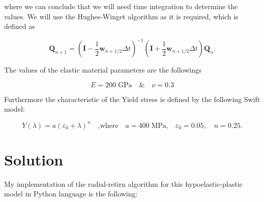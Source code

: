 \documentclass[12pt,a4paper]{article}
\begin{document}
where we can conclude that we will need time integration to determine the values. We will use the Hughes-Winget algorithm as it is required, which is defined as 

\begin{equation}
    \boldsymbol{Q}_{n+1} = \left(\boldsymbol{I} - \frac{1}{2} \boldsymbol{w}_{n+1/2} \Delta t \right)^{-1} 
\left(\boldsymbol{I} + \frac{1}{2} \boldsymbol{w}_{n+1/2} \Delta t \right) 
\boldsymbol{Q}_n.
\end{equation}

The values of the elastic material parameters are the followings

\begin{equation}
    E = 200 \;\text{GPa} \quad\&\quad \nu = 0.3
\end{equation}

Furthermore the characteristic of the Yield stress is defined by the following Swift model:

\begin{equation}
    Y(\lambda) = a(\varepsilon_0+\lambda)^n\quad \text{,where} \quad a=400\;\text{MPa,} \quad \varepsilon_0=0.05, \quad n=0.25.
\end{equation}

\newpage

\section*{Solution}

My implementation of the radial-retirn algorithm for this hypoelastic-plastic model in Python language is the following:
\end{document}
